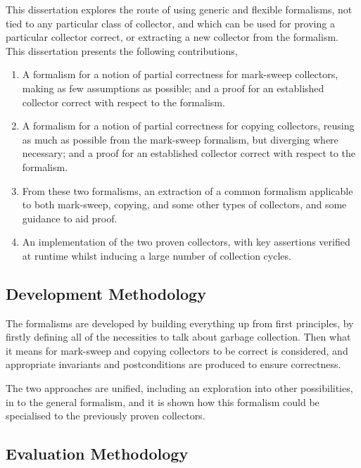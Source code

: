 This dissertation explores the route of using generic and flexible
formalisms, not tied to any particular class of collector, and which
can be used for proving a particular collector correct, or extracting
a new collector from the formalism. This dissertation presents the
following contributions,

\begin{enumerate}
  \item A formalism for a notion of partial correctness for mark-sweep
    collectors, making as few assumptions as possible; and a proof for
    an established collector correct with respect to the formalism.

  \item A formalism for a notion of partial correctness for copying
    collectors, reusing as much as possible from the mark-sweep
    formalism, but diverging where necessary; and a proof for an
    established collector correct with respect to the formalism.

  \item From these two formalisms, an extraction of a common formalism
    applicable to both mark-sweep, copying, and some other types of
    collectors, and some guidance to aid proof.

  \item An implementation of the two proven collectors, with key
    assertions verified at runtime whilst inducing a large number of
    collection cycles.
\end{enumerate}

\subsection{Development Methodology}
\label{sec:intro-goals-development}

The formalisms are developed by building everything up from first
principles, by firstly defining all of the necessities to talk about
garbage collection. Then what it means for mark-sweep and copying
collectors to be correct is considered, and appropriate invariants and
postconditions are produced to ensure correctness.

The two approaches are unified, including an exploration into other
possibilities, in to the general formalism, and it is shown how this
formalism could be specialised to the previously proven collectors.

\subsection{Evaluation Methodology}
\label{sec:intro-goals-evaluation}

